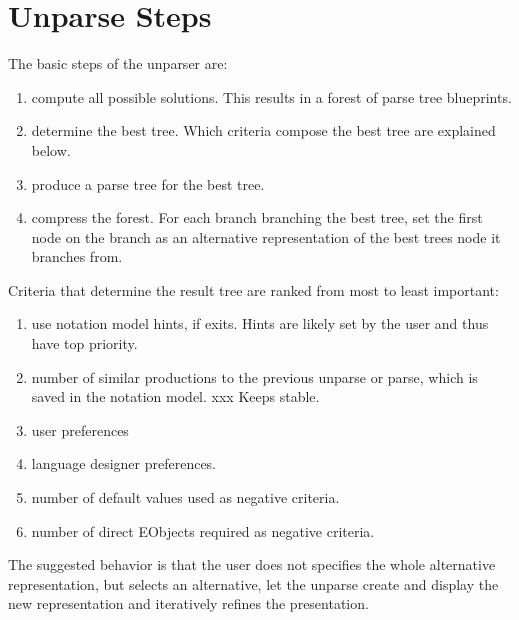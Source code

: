 \section{Unparse Steps}
The basic steps of the unparser are:
\begin{enumerate}
	\item compute all possible solutions. This results in a forest of parse tree blueprints.
	\item determine the best tree. Which criteria compose the best tree are explained below.
	\item produce a parse tree for the best tree. 
	\item compress the forest. For each branch branching the best tree, set the first node on the branch as an alternative representation of the best trees node it branches from.
\end{enumerate}

Criteria that determine the result tree are ranked from most to least important:
\begin{enumerate}
	\item use notation model hints, if exits. Hints are likely set by the user and thus have top priority.
	\item number of similar productions to the previous unparse or parse, which is saved in the notation model. xxx Keeps stable.
	\item user preferences
	\item language designer preferences.
	\item number of default values used as negative criteria.
	\item number of direct EObjects required as negative criteria.
\end{enumerate}


The suggested behavior is that the user does not specifies the whole alternative representation, but selects an alternative, let the unparse create and display the new representation and iteratively refines the presentation. 